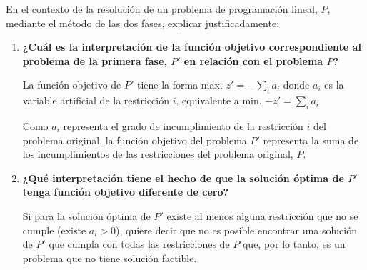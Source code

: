 En el contexto de la resolución de un problema de programación  lineal, $P$, mediante el método de las dos fases, explicar justificadamente:
\begin{enumerate}
    \item \textbf{¿Cuál es la interpretación de la función objetivo correspondiente al problema de la primera fase, $P'$ en relación con el problema $P$?}

    La función objetivo de $P'$ tiene la forma max. $z' = -\sum_i a_i$ donde $a_i$ es la variable artificial de la restricción $i$, equivalente a min. $-z' = \sum_i a_i$

    Como $a_i$ representa el grado de incumplimiento de la restricción $i$ del problema original, la función objetivo del problema $P'$ representa la suma de los incumplimientos de las restricciones del problema original, $P$.
    
    \item \textbf{¿Qué interpretación tiene el hecho de que la solución óptima de $P'$ tenga función objetivo diferente de cero?}

    Si para la solución óptima de $P'$ existe al menos alguna restricción que no se cumple (existe $a_i>0$), quiere decir que no es posible encontrar una solución de $P'$ que cumpla con todas las restricciones de $P$ que, por lo tanto, es un problema que no tiene solución factible.
    
\end{enumerate}

